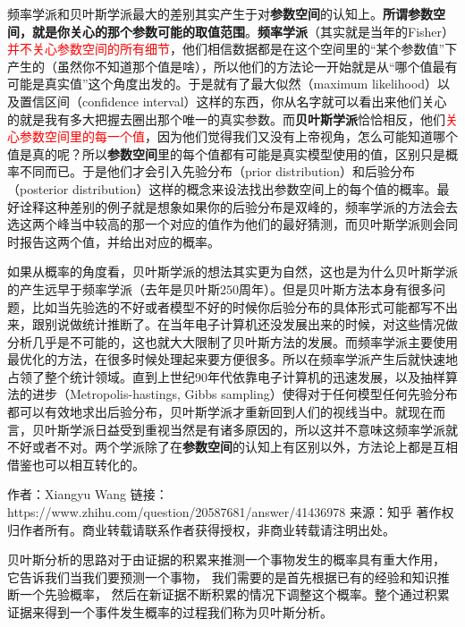\documentclass[UTF8]{ctexart}
\begin{document}
频率学派和贝叶斯学派最大的差别其实产生于对\textbf{参数空间}的认知上。\textbf{所谓参数空间，就是你关心的那个参数可能的取值范围}。\textbf{频率学派}（其实就是当年的Fisher）\textcolor{red}{并不关心参数空间的所有细节}，他们相信数据都是在这个空间里的“某个参数值”下产生的（虽然你不知道那个值是啥），所以他们的方法论一开始就是从“哪个值最有可能是真实值”这个角度出发的。于是就有了最大似然（maximum likelihood）以及置信区间（confidence interval）这样的东西，你从名字就可以看出来他们关心的就是我有多大把握去圈出那个唯一的真实参数。而\textbf{贝叶斯学派}恰恰相反，他们\textcolor{red}{关心参数空间里的每一个值}，因为他们觉得我们又没有上帝视角，怎么可能知道哪个值是真的呢？所以\textbf{参数空间}里的每个值都有可能是真实模型使用的值，区别只是概率不同而已。于是他们才会引入先验分布（prior distribution）和后验分布（posterior distribution）这样的概念来设法找出参数空间上的每个值的概率。最好诠释这种差别的例子就是想象如果你的后验分布是双峰的，频率学派的方法会去选这两个峰当中较高的那一个对应的值作为他们的最好猜测，而贝叶斯学派则会同时报告这两个值，并给出对应的概率。

如果从概率的角度看，贝叶斯学派的想法其实更为自然，这也是为什么贝叶斯学派的产生远早于频率学派（去年是贝叶斯250周年）。但是贝叶斯方法本身有很多问题，比如当先验选的不好或者模型不好的时候你后验分布的具体形式可能都写不出来，跟别说做统计推断了。在当年电子计算机还没发展出来的时候，对这些情况做分析几乎是不可能的，这也就大大限制了贝叶斯方法的发展。而频率学派主要使用最优化的方法，在很多时候处理起来要方便很多。所以在频率学派产生后就快速地占领了整个统计领域。直到上世纪90年代依靠电子计算机的迅速发展，以及抽样算法的进步（Metropolis-hastings, Gibbs sampling）使得对于任何模型任何先验分布都可以有效地求出后验分布，贝叶斯学派才重新回到人们的视线当中。就现在而言，贝叶斯学派日益受到重视当然是有诸多原因的，所以这并不意味这频率学派就不好或者不对。两个学派除了在\textbf{参数空间}的认知上有区别以外，方法论上都是互相借鉴也可以相互转化的。

作者：Xiangyu Wang
链接：https://www.zhihu.com/question/20587681/answer/41436978
来源：知乎
著作权归作者所有。商业转载请联系作者获得授权，非商业转载请注明出处。

贝叶斯分析的思路对于由证据的积累来推测一个事物发生的概率具有重大作用， 它告诉我们当我们要预测一个事物， 我们需要的是首先根据已有的经验和知识推断一个先验概率， 然后在新证据不断积累的情况下调整这个概率。整个通过积累证据来得到一个事件发生概率的过程我们称为贝叶斯分析。

\end{document}
